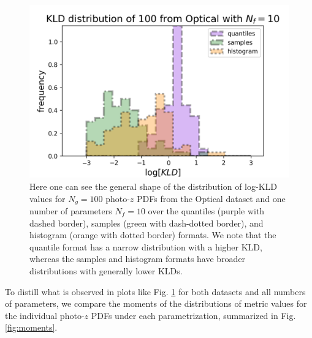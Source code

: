 \documentclass[\docopts]{\docclass}
\newcommand{\pz}{photo-$z$ PDF}
\begin{document}
\begin{figure}
  \includegraphics[width=0.9\columnwidth]{figures/lsst_individual.png}
  \caption{Here one can see the general shape of the distribution of log-KLD 
values for $N_{g}=100$ \pz s from the Optical dataset and one number of 
parameters $N_{f}=10$ over the quantiles (purple with dashed border), samples 
(green with dash-dotted border), and histogram (orange with dotted border) 
formats.  We note that the quantile format has a narrow distribution with a 
higher KLD, whereas the samples and histogram formats have broader 
distributions with generally lower KLDs.
  \label{fig:individual}}
\end{figure}

To distill what is observed in plots like Fig. \ref{fig:individual} for both 
datasets and all numbers of parameters, we compare the moments of the 
distributions of metric values for the individual \pz s under each 
parametrization, summarized in Fig. \ref{fig:moments}.
\end{document}
